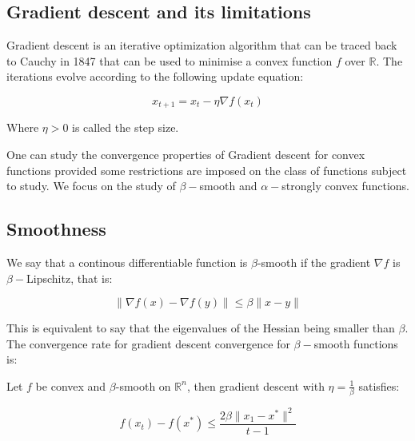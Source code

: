 
\subsection{Gradient descent and its limitations}

Gradient descent is an iterative optimization algorithm that can be traced back to Cauchy in 1847 that can be used to minimise a convex function $f$ over $\mathbb{R}$. The iterations evolve according to the following update equation:

\begin{equation}
    x_{t+1} = x_t - \eta \nabla f(x_t)
\end{equation}

Where $\eta > 0$ is called the step size. 

One can study the convergence properties of Gradient descent for convex functions provided some restrictions are imposed on the class of functions subject to study. We focus on the study of $\beta-$smooth and $\alpha-$strongly convex functions. 

\subsection{Smoothness}

\begin{definition}

We say that a continous differentiable function is $\beta$-smooth if the gradient $\nabla f$ is $\beta-$Lipschitz, that is:

\begin{equation}
    \parallel \nabla f(x) - \nabla f(y) \parallel \leq \beta \parallel x - y \parallel
\end{equation}

\end{definition}

This is equivalent to say that the eigenvalues of the Hessian being smaller than $\beta$. 
The convergence rate for gradient descent convergence for $\beta-$smooth functions is:

\begin{theorem}

Let $f$ be convex and $\beta$-smooth on $\mathbb{R}^n$, then gradient descent with $\eta = \frac{1}{\beta}$ satisfies:

\begin{equation}
f(x_t) - f(x^*) \leq \frac{2\beta \parallel x_1 - x^* \parallel^2}{t-1}
\end{equation}

\end{theorem}


